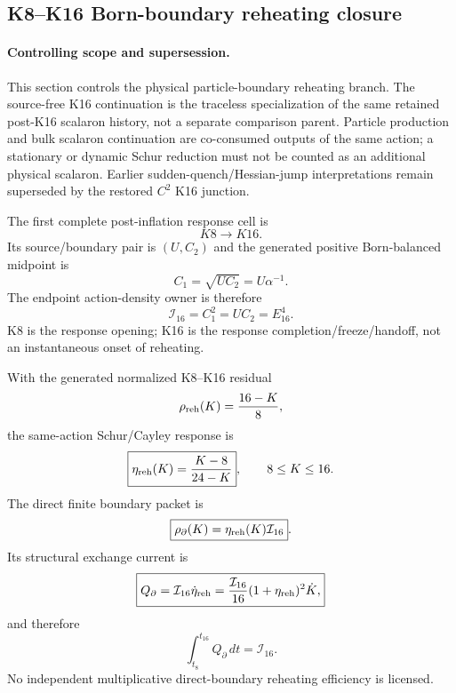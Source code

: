 \documentclass[12pt,a4paper]{article}
\begin{document}


\subsection{K8--K16 Born-boundary reheating closure}
\label{p8:sec:v2134-k8-k16-reheating-closure}

\paragraph{Controlling scope and supersession.}
This section controls the physical particle-boundary reheating branch.  The
source-free K16 continuation is the traceless specialization of the same retained
post-K16 scalaron history, not a separate comparison parent.  Particle production
and bulk scalaron continuation are co-consumed outputs of the same action; a
stationary or dynamic Schur reduction must not be counted as an additional
physical scalaron.  Earlier sudden-quench/Hessian-jump interpretations remain
superseded by the restored $C^2$ K16 junction.

\begin{theorem}
\label{p8:thm:v2134-reheating-cell}
The first complete post-inflation response cell is
\[
 \boxed{K8\longrightarrow K16}.
\]
Its source/boundary pair is $(U,C_2)$ and the generated positive Born-balanced
midpoint is
\[
 \boxed{C_1=\sqrt{UC_2}=U\alpha^{-1}}.
\]
The endpoint action-density owner is therefore
\[
 \boxed{\mathcal I_{16}=C_1^2=UC_2=E_{16}^4}.
\]
K8 is the response opening; K16 is the response completion/freeze/handoff, not
an instantaneous onset of reheating.
\end{theorem}

\begin{corollary}
\label{p8:cor:v2134-reheating-response-law}
With the generated normalized K8--K16 residual
\[
 \rho_{\rm reh}(K)=\frac{16-K}{8},
\]
the same-action Schur/Cayley response is
\[
 \boxed{\eta_{\rm reh}(K)=\frac{K-8}{24-K}},
 \qquad 8\le K\le16.
\]
The direct finite boundary packet is
\[
 \boxed{\rho_\partial(K)=\eta_{\rm reh}(K)\mathcal I_{16}}.
\]
Its structural exchange current is
\[
 \boxed{
 Q_\partial
 =\mathcal I_{16}\dot\eta_{\rm reh}
 =\frac{\mathcal I_{16}}{16}(1+\eta_{\rm reh})^2\dot K,}
\]
and therefore
\[
 \boxed{\int_{t_8}^{t_{16}}Q_\partial\,dt=\mathcal I_{16}}.
\]
No independent multiplicative direct-boundary reheating efficiency is licensed.
\end{corollary}
\end{document}
